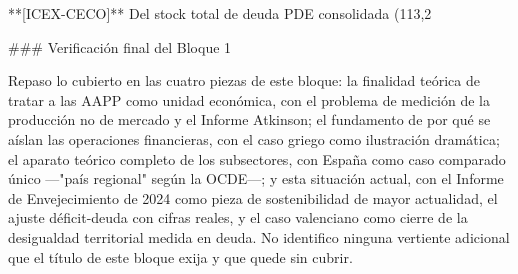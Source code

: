 \documentclass[10pt,a4paper]{article}
\begin{document}
**[ICEX-CECO]** Del stock total de deuda PDE consolidada (113,2%

### Verificación final del Bloque 1

Repaso lo cubierto en las cuatro piezas de este bloque: la finalidad teórica de tratar a las AAPP como unidad económica, con el problema de medición de la producción no de mercado y el Informe Atkinson; el fundamento de por qué se aíslan las operaciones financieras, con el caso griego como ilustración dramática; el aparato teórico completo de los subsectores, con España como caso comparado único —"país regional" según la OCDE—; y esta situación actual, con el Informe de Envejecimiento de 2024 como pieza de sostenibilidad de mayor actualidad, el ajuste déficit-deuda con cifras reales, y el caso valenciano como cierre de la desigualdad territorial medida en deuda. No identifico ninguna vertiente adicional que el título de este bloque exija y que quede sin cubrir.
\end{document}
